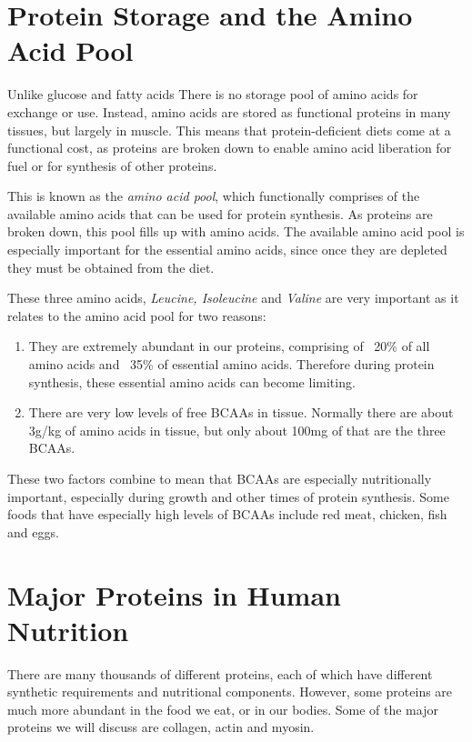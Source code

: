 \documentclass{tufte-handout}
\begin{document}
\section{Protein Storage and the Amino Acid Pool}

Unlike glucose and fatty acids  There is no storage pool of amino acids for exchange or use.  Instead, amino acids are stored as functional proteins in many tissues, but largely in muscle.  This means that protein-deficient diets come at a functional cost, as proteins are broken down to enable amino acid liberation for fuel or for synthesis of other proteins.

  This is known as the \emph{amino acid pool}, which functionally comprises of the available amino acids that can be used for protein synthesis.  As proteins are broken down, this pool fills up with amino acids.  The available amino acid pool is especially important for the essential amino acids, since once they are depleted they must be obtained from the diet.

  These three amino acids, \emph{Leucine, Isoleucine} and \emph{Valine} are very important as it relates to the amino acid pool for two reasons:
\begin{enumerate}
\item They are extremely abundant in our proteins, comprising of ~20\% of all amino acids and ~35\% of essential amino acids.  Therefore during protein synthesis, these essential amino acids can become limiting.
\item There are very low levels of free BCAAs in tissue.  Normally there are about 3g/kg of amino acids in tissue, but only about 100mg of that are the three BCAAs.
\end{enumerate}

These two factors combine to mean that BCAAs are especially nutritionally important, especially during growth and other times of protein synthesis.  Some foods that have especially high levels of BCAAs include red meat, chicken, fish and eggs.

\section{Major Proteins in Human Nutrition}
There are many thousands of different proteins, each of which have different synthetic requirements and nutritional components.  However, some proteins are much more abundant in the food we eat, or in our bodies.  Some of the major proteins we will discuss are collagen, actin and myosin.  
\end{document}
